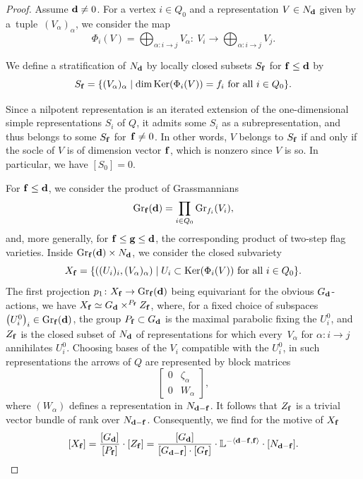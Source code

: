 \documentclass[pdftex]{sigma}
\numberwithin{equation}{section}
\theoremstyle{definition}
\begin{document}
\begin{proof} Assume ${\bf d}\not=0$. For a vertex $i\in Q_0$ and a representation $V\in N_{\bf d}$ given by a~tuple~$(V_\alpha)_\alpha$, we consider the map
\[\Phi_i(V)=\bigoplus_{\alpha\colon i\rightarrow j}V_\alpha\colon\ V_i\rightarrow\bigoplus_{\alpha\colon i\rightarrow j}V_j.\]

We define a stratification of $N_{\bf d}$ by locally closed subsets $S_{\bf f}$ for ${\bf f}\leq{\bf d}$ by
\[S_{\bf f}=\{(V_\alpha)_\alpha \mid \dim{\rm Ker}(\Phi_i(V))=f_i\mbox{ for all }i\in Q_0\}.\]

Since a nilpotent representation is an iterated extension of the one-dimensional simple representations $S_i$ of $Q$, it admits some $S_i$ as a subrepresentation, and thus belongs to some $S_{\bf f}$ for~${{\bf f}\not={ 0}}$. In other words, $V$ belongs to $S_{\bf f}$ if and only if the socle of $V$ is of dimension vector ${\bf f}$, which is nonzero since $V$ is so. In particular, we have $[S_{ 0}]=0$.

For ${\bf f}\leq{\bf d}$, we consider the product of Grassmannians
\[{\rm Gr}_{\bf f}({\bf d})=\prod_{i\in Q_0}{\rm Gr}_{f_i}(V_i),\]
and, more generally, for ${\bf f}\leq{\bf g}\leq{\bf d}$, the corresponding product  of two-step flag varieties.
Inside ${\rm Gr}_{\bf f}({\bf d})\times N_{\bf d}$, we consider the closed subvariety
\[X_{\bf f}=\{((U_i)_i,(V_\alpha)_\alpha) \mid U_i\subset{\rm Ker}(\Phi_i(V))\mbox{ for all }i\in Q_0\}.\]
The first projection $p_1\colon X_{\bf f}\rightarrow {\rm Gr}_{\bf f}({\bf d})$ being equivariant for the obvious $G_{\bf d}$-actions, we have $X_{\bf f}\simeq G_{\bf d}\times^{P_{\bf f}}Z_{\bf f}$,
where, for a fixed choice of subspaces $\bigl(U_i^0\bigr)_i\in {\rm Gr}_{\bf f}({\bf d})$, the group $P_{\bf f}\subset G_{\bf d}$ is the maximal parabolic fixing the $U_i^0$, and $Z_{\bf f}$ is the closed subset of $N_{\bf d}$ of representations for which every~$V_\alpha$ for $\alpha\colon i\rightarrow j$ annihilates $U_i^0$. Choosing bases of the $V_i$ compatible with the $U_i^0$, in such representations the arrows of $Q$ are represented by block matrices
\[
\left[\begin{matrix}0&\zeta_\alpha\\ 0&W_\alpha\end{matrix}\right],
\]
where $(W_\alpha)$ defines a representation in $N_{{\bf d}-{\bf f}}$. It follows that $Z_{\bf f}$ is a trivial vector bundle of rank  over $N_{{\bf d}-{\bf f}}$. Consequently, we find for the motive of $X_{\bf f}$
\[[X_{\bf f}]=\frac{[G_{\bf d}]}{[P_{\bf f}]}\cdot[Z_{\bf f}]=\frac{[G_{\bf d}]}{[G_{{\bf d}-{\bf f}}]\cdot[G_{\bf f}]}\cdot\mathbb{L}^{-\langle{\bf d}-{\bf f},{\bf f}\rangle}\cdot[N_{{\bf d}-{\bf f}}].\]


\end{proof}
\end{document}
